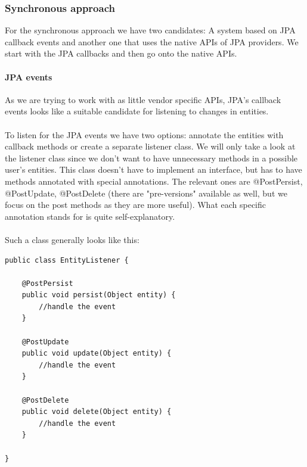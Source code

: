 \pagebreak

\subsubsection{Synchronous approach}

For the synchronous approach we have two candidates: A system based on JPA callback events and another one that uses the native APIs of JPA providers. We start with the JPA callbacks and then go onto the native APIs.

\paragraph{JPA events}

As we are trying to work with as little vendor specific APIs, JPA's callback events looks like a suitable candidate for listening to changes in entities.
\\\\
To listen for the JPA events we have two options: annotate the entities with callback methods or create a separate listener class. We will only take a look at the listener class since we don't want to have unnecessary methods in a possible user's entities. This class doesn't have to implement an interface, but has to have methods annotated with special annotations. The relevant ones are @PostPersist, @PostUpdate, @PostDelete (there are "pre-versions" available as well, but we focus on the post methods as they are more useful). What each specific annotation stands for is quite self-explanatory.
\\\\
Such a class generally looks like this:
\\
\lstset{language=java}
\begin{lstlisting}[frame=htrbl, caption={Example JPA entity listener}, label={lst:jpa_entity_listener.java}]
public class EntityListener {

	@PostPersist
	public void persist(Object entity) {
		//handle the event
	}
	
	@PostUpdate
	public void update(Object entity) {
		//handle the event
	}
	
	@PostDelete
	public void delete(Object entity) {
		//handle the event
	}

}
\end{lstlisting}

\pagebreak


